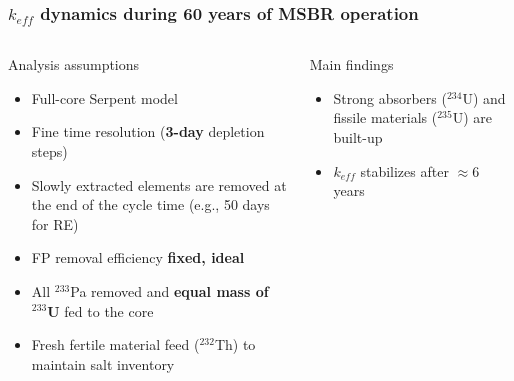 \begin{frame}
\frametitle{$k_{eff}$ dynamics during 60 years of MSBR operation}
\vspace{-3mm}
\begin{columns}
	\column{4.3cm}
	\begin{block}{Analysis assumptions}
		\fontsize{7}{9}\selectfont
		\begin{itemize}
			\item Full-core Serpent model
			\item Fine time resolution (\textbf{3-day} depletion steps)
			\item Slowly extracted elements are removed at the end of the 
			cycle time (e.g., 50 days for RE)
			\item FP removal efficiency \textbf{fixed, ideal}
			\item All $^{233}$Pa removed and \textbf{equal mass of $^{233}$U} 
			fed to the core
			\item Fresh fertile material feed ($^{232}$Th) to maintain salt 
			inventory
		\end{itemize}
	\end{block}
	\vspace{-2mm}
	\begin{block}{Main findings}
	\fontsize{7}{9}\selectfont
	\begin{itemize}
		\item Strong absorbers ($^{234}$U) and fissile materials ($^{235}$U) 
		are built-up
		\item $k_{eff}$ stabilizes after $\approx6$ years
	\end{itemize}  
	\end{block}  	
	

\end{columns}
\end{frame}
